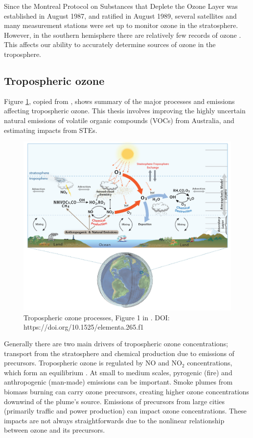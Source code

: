     
    Since the Montreal Protocol on Substances that Deplete the Ozone Layer was established in August 1987, and ratified in August 1989, several satellites and many measurement stations were set up to monitor ozone in the stratosphere.
    However, in the southern hemisphere there are relatively few records of ozone \parencite{Huang2017}.
    This affects our ability to accurately determine sources of ozone in the troposphere.
  
  \subsection{Tropospheric ozone}
    Figure \ref{LR:O3:fig_YoungOzoneSummary}, copied from \textcite{Young2018}, shows summary of the major processes and emissions affecting tropospheric ozone.
    This thesis involves improving the highly uncertain natural emissions of volatile organic compounds (VOCs) from Australia, and estimating impacts from STEs.
    
    \begin{figure}
      \includegraphics[width=\textwidth]{Figures/Young2018_Figure1.png}
      \caption{%
        Tropospheric ozone processes, Figure 1 in \textcite{Young2018}.
        DOI: https://doi.org/10.1525/elementa.265.f1
      }
      \label{LR:O3:fig_YoungOzoneSummary}
    \end{figure}
  
    Generally there are two main drivers of tropospheric ozone concentrations; transport from the stratosphere and chemical production due to emissions of precursors. 
    Tropospheric ozone is regulated by NO and NO$_2$ concentrations, which form an equilibrium \parencite{Cape2008,Young2018}.
    At small to medium scales, pyrogenic (fire) and anthropogenic (man-made) emissions can be important.
    Smoke plumes from biomass burning can carry ozone precursors, creating higher ozone concentrations downwind of the plume's source.
    Emissions of precursors from large cities (primarily traffic and power production) can impact ozone concentrations.
    These impacts are not always straightforwards due to the nonlinear relationship between ozone and its precursors.
    
